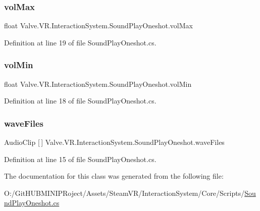 \subsubsection{\texorpdfstring{volMax}{volMax}}
{\footnotesize\ttfamily float Valve.\+V\+R.\+Interaction\+System.\+Sound\+Play\+Oneshot.\+vol\+Max}



Definition at line 19 of file Sound\+Play\+Oneshot.\+cs.

\mbox{\label{class_valve_1_1_v_r_1_1_interaction_system_1_1_sound_play_oneshot_a046eafb48c98823a1e755fa1689dc661}} 
\subsubsection{\texorpdfstring{volMin}{volMin}}
{\footnotesize\ttfamily float Valve.\+V\+R.\+Interaction\+System.\+Sound\+Play\+Oneshot.\+vol\+Min}



Definition at line 18 of file Sound\+Play\+Oneshot.\+cs.

\mbox{\label{class_valve_1_1_v_r_1_1_interaction_system_1_1_sound_play_oneshot_a1aacc158d26e2382435f2627e3d863e2}} 
\subsubsection{\texorpdfstring{waveFiles}{waveFiles}}
{\footnotesize\ttfamily Audio\+Clip \mbox{[}$\,$\mbox{]} Valve.\+V\+R.\+Interaction\+System.\+Sound\+Play\+Oneshot.\+wave\+Files}



Definition at line 15 of file Sound\+Play\+Oneshot.\+cs.



The documentation for this class was generated from the following file\+:\begin{DoxyCompactItemize}
\item 
O\+:/\+Git\+H\+U\+B\+M\+I\+N\+I\+P\+Roject/\+Assets/\+Steam\+V\+R/\+Interaction\+System/\+Core/\+Scripts/\mbox{\hyperlink{_sound_play_oneshot_8cs}{Sound\+Play\+Oneshot.\+cs}}\end{DoxyCompactItemize}
